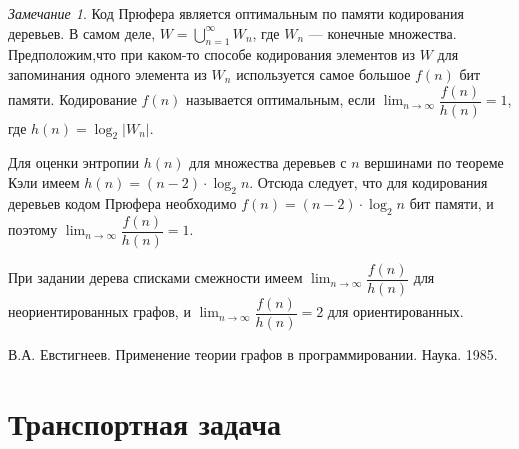 \documentclass[12pt,a4paper]{article}
\theoremstyle{plain}
\theoremstyle{definition}
\theoremstyle{remark}
\newtheorem*{remark}{Замечание}
\begin{document}
\begin{remark}
Код Прюфера является оптимальным по памяти кодирования деревьев. В самом деле, $W = \bigcup_{n=1}^\infty W_n$, где $W_n$ --- конечные множества. Предположим,что при каком-то способе кодирования элементов из $W$ для запоминания одного элемента из $W_n$ используется самое большое $f(n)$ бит памяти. Кодирование $f(n)$ называется оптимальным, если $\lim_{n\to\infty} \dfrac{f(n)}{h(n)} = 1$, где $h(n) = \log_2 \vert W_n \vert$.

Для оценки энтропии $h(n)$ для множества деревьев с $n$ вершинами по теореме Кэли имеем $h(n) = (n-2)\cdot \log_2 n$. Отсюда следует, что для кодирования деревьев кодом Прюфера необходимо $f(n) = (n-2)\cdot\log_2 n$ бит памяти, и поэтому $\lim_{n\to\infty} \dfrac{f(n)}{h(n)} = 1$.

При задании дерева списками смежности имеем $\lim_{n\to\infty} \dfrac{f(n)}{h(n)}$ для неориентированных графов, и $\lim_{n\to\infty} \dfrac{f(n)}{h(n)} = 2$ для ориентированных.
\end{remark}

В.А. Евстигнеев. Применение теории графов в программировании. Наука. 1985.

\section{Транспортная задача}
\end{document}
